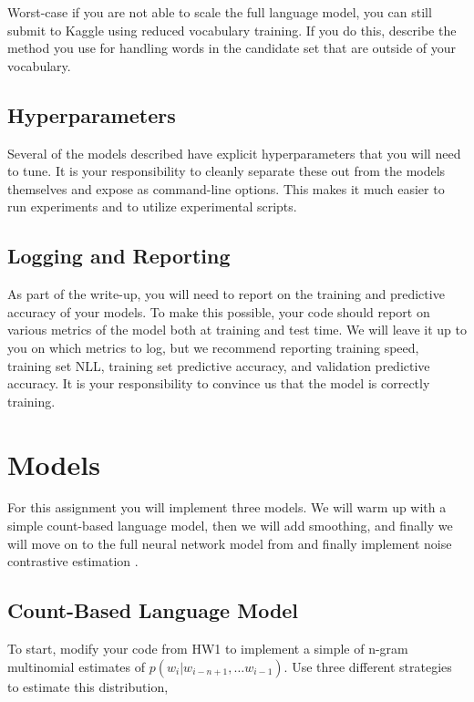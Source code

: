 \documentclass[11pt]{article}
\begin{document}
Worst-case if you are not able to scale the full language model, you
can still submit to Kaggle using reduced vocabulary training. If you do this, 
describe the method you use for handling words in the candidate set that are 
outside of your vocabulary.


\subsection{Hyperparameters}

Several of the models described have explicit hyperparameters that you will 
need to tune. It is your responsibility to cleanly separate these out from 
the models themselves and expose as command-line options. This makes it much 
easier to run experiments and to utilize experimental scripts. 

\subsection{Logging and Reporting}

As part of the write-up, you will need to report on the training and
predictive accuracy of your models. To make this possible, your code
should report on various metrics of the model both at training and
test time. We will leave it up to you on which metrics to log, but we
recommend reporting training speed, training set NLL, training set
predictive accuracy, and validation predictive accuracy. It is your
responsibility to convince us that the model is correctly training.

\section{Models}

For this assignment you will implement three models. We will warm
up with a simple count-based language model, then we will add
smoothing, and finally we will move on to the full neural network
model from \citet{DBLP:journals/jmlr/BengioDVJ03} and finally implement noise contrastive estimation \citep{gutmann2010noise}.

\subsection{Count-Based Language Model}

To start, modify your code from HW1 to implement a simple of
n-gram multinomial estimates of $p(w_i | w_{i-n+1}, \ldots w_{i-1})$. 
Use three different strategies to estimate this distribution,
\end{document}
